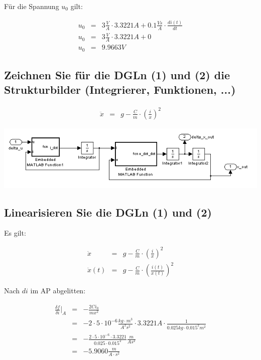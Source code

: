 \documentclass[a4paper,10pt,left=1.5cm,right=1.5cm,top=1.5cm,bottom=1.5cm]{article}
\begin{document}
Für die Spannung $u_0$ gilt:

\begin{eqnarray*}
  u_0 &=& 3 \frac{V}{A} \cdot 3.3221 A + 0.1 \frac{Vs}{A} \cdot \frac{di(t)}{dt} \\
  u_0 &=& 3 \frac{V}{A} \cdot 3.3221 A + 0 \\
  u_0 &=& 9.9663 V
\end{eqnarray*}

\subsection{Zeichnen Sie für die DGLn (1) und (2) die Strukturbilder (Integrierer, Funktionen, ...)}

\begin{eqnarray*}
  \ddot{x} &=& g - \frac{C}{m} \cdot \left(\frac{i}{x}\right)^2
\end{eqnarray*}

\includegraphics[width=1\textwidth]{dgln.png}

\subsection{Linearisieren Sie die DGLn (1) und (2)}

Es gilt:

\begin{eqnarray*}
  \ddot{x} &=& g - \frac{C}{m} \cdot \left(\frac{i}{x}\right)^2 \\
  \ddot{x}(t) &=& g - \frac{C}{m} \cdot \left(\frac{i(t)}{x(t)}\right)^2 
\end{eqnarray*}

Nach $di$ im AP abgelitten:

\begin{eqnarray*}
  \frac{\delta f}{\delta i} \bigg\vert_A &=& - \frac{2 C i_0}{mx^2} \\
&=& - 2 \cdot 5 \cdot 10^{-6} \frac{kg \cdot m^3}{A^2 s^2} \cdot 3.3221 A \cdot \frac{1}{0.025 kg \cdot 0.015^2 m^2} \\
&=& - \frac{2 \cdot 5 \cdot 10^{-6} \cdot 3.3221}{0.025 \cdot 0.015^2} \frac{m}{A s^2}\\
&=& -5.9060 \frac{m}{A \cdot s^2}
\end{eqnarray*}
\end{document}
